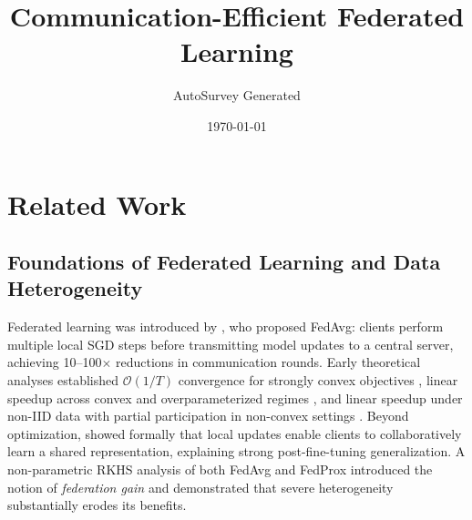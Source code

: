 \documentclass[11pt]{article}
\title{Communication-Efficient Federated Learning}
\author{AutoSurvey Generated}
\date{\today}
\begin{document}
\maketitle

\section{Related Work}

\subsection{Foundations of Federated Learning and Data Heterogeneity}

Federated learning was introduced by \citet{mcmahan2017communication}, who proposed FedAvg: clients perform multiple local SGD steps before transmitting model updates to a central server, achieving 10--100$\times$ reductions in communication rounds. Early theoretical analyses established $\mathcal{O}(1/T)$ convergence for strongly convex objectives \citep{li2019convergence}, linear speedup across convex and overparameterized regimes \citep{qu2023unified}, and linear speedup under non-IID data with partial participation in non-convex settings \citep{Yang2021AchievingLS}. Beyond optimization, \citet{collins2022fedavg} showed formally that local updates enable clients to collaboratively learn a shared representation, explaining strong post-fine-tuning generalization. A non-parametric RKHS analysis of both FedAvg and FedProx \citep{su2023non} introduced the notion of \emph{federation gain} and demonstrated that severe heterogeneity substantially erodes its benefits.
\end{document}
